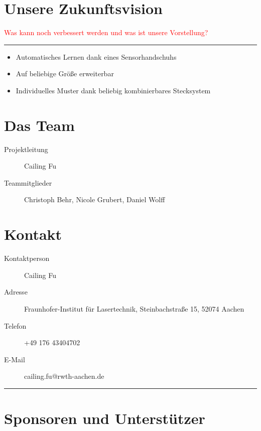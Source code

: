 \documentclass[a4paper,12pt,notumble]{leaflet}
\begin{document}
\newpage
\thispagestyle{empty}
\quad 
\newpage

\section{Unsere Zukunftsvision}
\textcolor{red}{Was kann noch verbessert werden und was ist unsere Vorstellung?}

\vspace*{\fill}
\textcolor{rwth-lblue}{\noindent\rule{\textwidth}{4pt}}
\begin{itemize}
\item Automatisches Lernen dank eines Sensorhandschuhs
\item Auf beliebige Größe erweiterbar
\item Individuelles Muster dank beliebig kombinierbares Stecksystem
\end{itemize}

\newpage

\section{Das Team}
\begin{description}
\item[Projektleitung] Cailing Fu
\item[Teammitglieder] Christoph Behr, Nicole Grubert, Daniel Wolff

\end{description}

\section{Kontakt}
\begin{description}
\item[Kontaktperson] Cailing Fu 
\item[Adresse] Fraunhofer-Institut für Lasertechnik, Steinbachstraße 15, 52074 Aachen
\item[Telefon] +49 176 43404702
\item[E-Mail] cailing.fu@rwth-aachen.de
\end{description}

\textcolor{rwth-lblue}{\noindent\rule{\textwidth}{4pt}}

\section{Sponsoren und Unterstützer}
\end{document}
